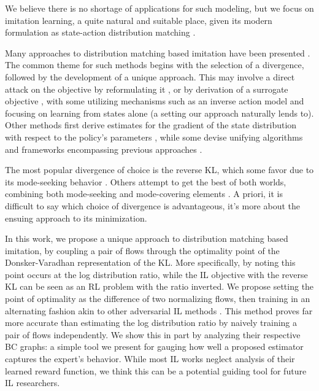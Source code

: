 
We believe there is no shortage of applications for such modeling, but we focus on imitation learning, a quite natural and suitable place, given its modern formulation as state-action distribution matching \cite{ghasemipour2020divergence}. 

Many approaches to distribution matching based imitation have been presented \cite{ho2016generative,fu2017learning,kostrikov2018discriminator,ke2020imitation, ghasemipour2020divergence, kostrikov2019imitation,sun2021softdice,kim2021imitation, dadashi2020primal,schroecker2020manipulating}. The common theme for such methods begins with the selection of a divergence, followed by the development of a unique approach. This may involve a direct attack on the objective by reformulating it \cite{kostrikov2019imitation}, or by derivation of a surrogate objective \cite{zhu2020off, dadashi2020primal, kim2021imitation}, with some utilizing mechanisms such as an inverse action model \cite{zhu2020off} and focusing on learning from states alone (a setting our approach naturally lends to). Other methods first derive estimates for the gradient of the state distribution with respect to the policy's parameters \cite{schroecker2020manipulating}, while some devise unifying algorithms and frameworks encompassing previous approaches \cite{ke2020imitation, ghasemipour2020divergence}. 


The most popular divergence of choice is the reverse KL, which some favor due to its mode-seeking behavior \cite{ghasemipour2020divergence}. Others attempt to get the best of both worlds, combining both mode-seeking and mode-covering elements \cite{zhu2020off}. A priori, it is difficult to say which choice of divergence is advantageous, it's more about the ensuing approach to its minimization.


In this work, we propose a unique approach to distribution matching based imitation, by coupling a pair of flows through the optimality point of the Donsker-Varadhan \cite{donsker1976asymptotic} representation of the KL. More specifically, by noting this point occurs at the log distribution ratio, while the IL objective with the reverse KL can be seen as an RL problem with the ratio inverted. We propose setting the point of optimality as the difference of two normalizing flows, then training in an alternating fashion akin to other adversarial IL methods \cite{ho2016generative,kostrikov2018discriminator, ghasemipour2020divergence, kostrikov2019imitation,sun2021softdice}. This method proves far more accurate than estimating the log distribution ratio by naively training a pair of flows independently. We show this in part by analyzing their respective BC graphs: a simple tool we present for gauging how well a proposed estimator captures the expert's behavior. While most IL works neglect analysis of their learned reward function, we think this can be a potential guiding tool for future IL researchers. 


